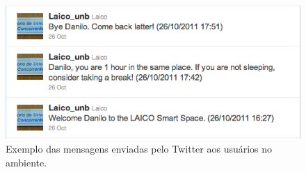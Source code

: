 	\begin{figure}[hbt]
			\begin{center}
				\includegraphics[scale=0.6]{figuras/5.Testes/tweets.png}
			\end{center}
			\caption{Exemplo das mensagens enviadas pelo Twitter aos usuários no ambiente.}
			\label{fig:tweets}
		\end{figure}	